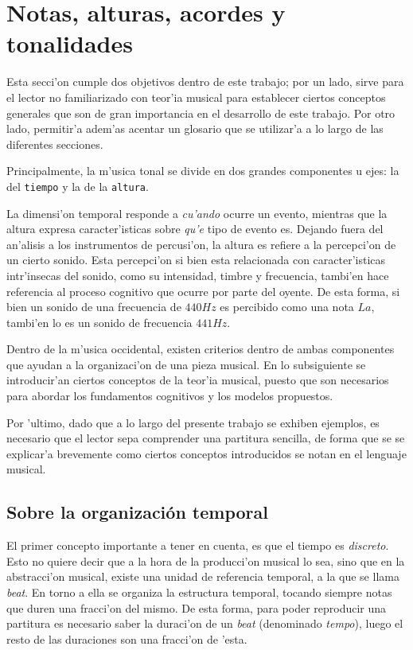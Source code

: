 \section{Notas, alturas, acordes y tonalidades}
\label{sec:musical_intro}
Esta secci'on cumple dos objetivos dentro de este trabajo; por un lado, sirve para el lector no familiarizado con teor'ia musical para establecer
ciertos conceptos generales que son de gran importancia en el desarrollo de este trabajo. Por otro lado, permitir'a adem'as acentar un glosario
que se utilizar'a a lo largo de las diferentes secciones.

Principalmente, la m'usica tonal se divide en dos grandes componentes u ejes: la del \texttt{tiempo} y la de la \texttt{altura}. 

La dimensi'on temporal responde a \emph{cu'ando} ocurre un evento, mientras que la altura expresa caracter'isticas sobre \emph{qu'e}
tipo de evento es.  Dejando fuera del an'alisis a los instrumentos de percusi'on, la altura es refiere a la percepci'on de un cierto sonido. 
Esta percepci'on si bien esta relacionada con caracter'isticas intr'insecas del sonido, como su intensidad, timbre y frecuencia, 
tambi'en hace referencia
al proceso cognitivo que ocurre por parte del oyente. De esta forma, si bien un sonido de una frecuencia de $440Hz$ es percibido como una nota 
$La$, tambi'en lo es un sonido de frecuencia $441Hz$.

Dentro de la m'usica occidental, existen criterios dentro de ambas componentes que ayudan a la organizaci'on de una pieza musical. 
En lo subsiguiente se introducir'an ciertos conceptos de la teor'ia musical, puesto que son necesarios
para abordar los fundamentos cognitivos y los modelos propuestos. 

Por 'ultimo, dado que a lo largo del presente trabajo se exhiben ejemplos, es necesario que el lector sepa comprender una partitura sencilla, de forma que se se 
explicar'a brevemente como ciertos conceptos introducidos se notan en el lenguaje musical.

\subsection{Sobre la organizaci\'on temporal}
El primer concepto importante a tener en cuenta, es que el tiempo es \emph{discreto}. Esto no quiere decir que a la hora de la producci'on musical lo sea, sino que 
en la abstracci'on musical, existe una unidad de referencia temporal, a la que se llama \emph{beat}. En torno a ella se organiza la estructura temporal, tocando
siempre notas que duren una fracci'on del mismo. De esta forma, para poder reproducir una partitura es necesario saber la duraci'on de un \emph{beat} (denominado
\emph{tempo}), luego el resto de las duraciones son una fracci'on de 'esta.


